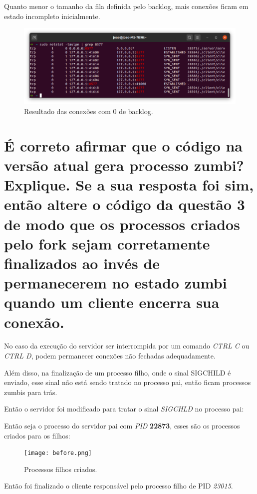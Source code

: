 \documentclass[12pt,a4paper]{report}
\begin{document}
Quanto menor o tamanho da fila definida pelo backlog, mais conexões ficam em estado incompleto inicialmente.

\begin{figure}[H]
  \includegraphics[width=\linewidth]{0back.png}
  \caption{Resultado das conexões com 0 de backlog.}
\end{figure}

\section{É correto afirmar que o código na versão atual gera processo zumbi? Explique. Se a
sua resposta foi sim, então altere o código da questão 3 de modo que os processos
criados pelo fork sejam corretamente finalizados ao invés de permanecerem no estado
zumbi quando um cliente encerra sua conexão.}

No caso da execução do servidor ser interrompida por um comando \emph{CTRL C} ou \emph{CTRL D}, podem permanecer conexões não fechadas adequadamente.

Além disso, na finalização de um processo filho, onde o sinal SIGCHILD é enviado, esse sinal não está sendo tratado no processo pai, então ficam processos zumbis para trás.

Então o servidor foi modificado para tratar o sinal \emph{SIGCHLD} no processo pai:


Então seja o processo do servidor pai com \emph{PID} \textbf{22873}, esses são os processos criados para os filhos:
\begin{figure}[H]
  \texttt{[image: before.png]}
  \caption{Processos filhos criados.}
\end{figure}

Então foi finalizado o cliente responsável pelo processo filho de PID \emph{23015}.
\end{document}
